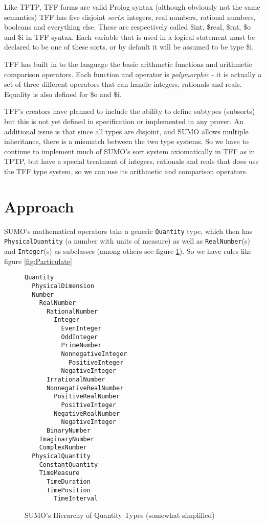 \documentclass{article}
\begin{document}
Like TPTP, TFF forms are valid Prolog syntax (although obviously not the same semantics)
TFF has five disjoint \textit{sorts}: integers, real numbers, rational numbers,
booleans and everything else. These are respectively called \$int, \$real,
\$rat, \$o and \$i in TFF syntax.  Each variable that is used in a logical
statement must be declared to be one of these sorts, or by default it will be
assumed to be type \$i.

TFF has built in to the language the basic arithmetic functions and arithmetic comparison
operators.  Each function and operator is \textit{polymorphic} - it is actually a set
of three different operators that can handle integers, rationals and reals.  Equality
is also defined for \$o and \$i.

TFF's creators have planned to include the ability to define subtypes (subsorts)
but this is not yet defined in specification or implemented in any prover.  An
additional issue is that since all types are disjoint, and SUMO allows multiple
inheritance, there is a mismatch between the two type systems.  So we have to
continue to implement much of SUMO's sort system axiomatically in TFF as in
TPTP, but have a special treatment of integers, rationals and reals that does
use the TFF type system, so we can use its arithmetic and comparison operators.

\section{Approach}

SUMO's mathematical operators take a generic \texttt{Quantity} type, which then
has \texttt{PhysicalQuantity} (a number with units of measure) as well as
\texttt{RealNumber}(s) and \texttt{Integer}(s) as subclasses (among others see
figure \ref{fig:QuantHier}).  So we have rules like figure \ref{fig:Particulate}

\begin{figure}[H]
\begin{framed}
\begin{verbatim}
Quantity
  PhysicalDimension
  Number	
    RealNumber
      RationalNumber
        Integer
          EvenInteger
          OddInteger
          PrimeNumber
          NonnegativeInteger
            PositiveInteger
          NegativeInteger
      IrrationalNumber
      NonnegativeRealNumber
        PositiveRealNumber
          PositiveInteger
        NegativeRealNumber
          NegativeInteger
      BinaryNumber
    ImaginaryNumber
    ComplexNumber
  PhysicalQuantity
    ConstantQuantity
    TimeMeasure
      TimeDuration
      TimePosition
        TimeInterval
\end{verbatim}
\end{framed}
\caption{SUMO's Hierarchy of Quantity Types (somewhat simplified)}
\label{fig:QuantHier}
\end{figure}
\end{document}
